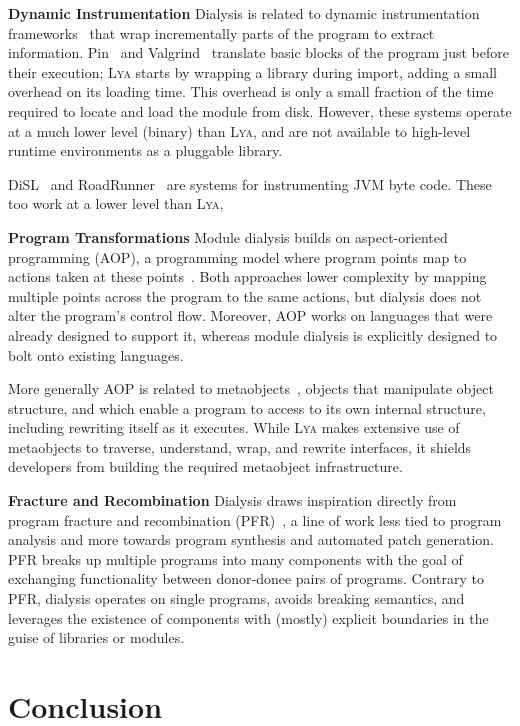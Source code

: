 \documentclass[letterpaper,twocolumn,10pt]{article}
\newcommand{\heading}[1]{\vspace{2pt}\noindent\textbf{#1}\enspace}
\newcommand{\sys}{{\scshape Lya}\xspace}
\begin{document}
\heading{Dynamic Instrumentation}
Dialysis is related to dynamic instrumentation frameworks~\cite{pin, valgrind} that wrap incrementally parts of the program to extract information.
Pin~\cite{pin} and Valgrind~\cite{valgrind} translate basic blocks of the program just before their execution;
  \sys starts by wrapping a library during import, adding a small overhead on its loading time.
This overhead is only a small fraction of the time required to locate and load the module from disk.
However, these systems operate at a much lower level (binary) than \sys, and are not available to high-level runtime environments as a pluggable library.

DiSL~\cite{disl} and RoadRunner~\cite{roadrunner} are systems for instrumenting JVM byte code.
These too work at a lower level than \sys, 

\heading{Program Transformations}
Module dialysis builds on aspect-oriented programming (AOP), a programming model where program points map to actions taken at these points~\cite{aop}.
Both approaches lower complexity by mapping multiple points across the program to the same actions, but dialysis does not alter the program's control flow.
Moreover, AOP works on languages that were already designed to support it, whereas module dialysis is explicitly designed to bolt onto existing languages.

More generally AOP is related to metaobjects~\cite{metaobject}, objects that manipulate object structure, and which enable a program to access to its own internal structure, including rewriting itself as it executes.
While \sys makes extensive use of metaobjects to traverse, understand, wrap, and rewrite interfaces, it shields developers from building the required metaobject infrastructure.

\heading{Fracture and Recombination}
Dialysis draws inspiration directly from program fracture and recombination (PFR)~\cite{fracture1, fracture3}, a line of work less tied to program analysis and more towards program synthesis and automated patch generation.
PFR breaks up multiple programs into many components with the goal of exchanging functionality between donor-donee pairs of programs.
Contrary to PFR, dialysis operates on single programs, avoids breaking semantics, and leverages the existence of components with (mostly) explicit boundaries in the guise of libraries or modules.

\section{Conclusion}
\label{end}
\end{document}
